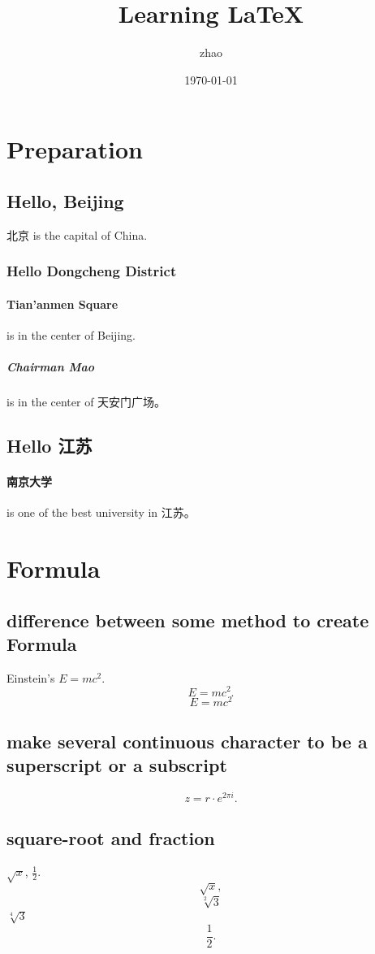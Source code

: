 \documentclass[12pt]{ctexart}
\title{Learning \LaTeX}
\author{zhao}
\date{\today}
\begin{document}
\maketitle
\tableofcontents
\section{Preparation}
\subsection{Hello, Beijing}
北京 is the capital of China.
\subsubsection{Hello Dongcheng District}
\paragraph{Tian'anmen Square}
is in the center of Beijing.
\subparagraph{Chairman Mao}
is in the center of 天安门广场。
\subsection{Hello 江苏}
\paragraph{南京大学} is one of the best university in 江苏。

\section{Formula}
\subsection{difference between some method to create Formula}
Einstein's $E=mc^2$.
\[E=mc^2.\]
\begin{equation}
    E=mc^2
\end{equation}
\subsection{make several continuous character to be a superscript or a subscript}
\[z=r\cdot e^{2\pi i}.\]
\subsection{square-root and fraction}
$\sqrt{x}$, $\frac{1}{2}$.
\[\sqrt{x},\]
\[\sqrt[2]{3}\]
$\sqrt[4]{3}$
\[\frac{1}{2}.\]
\end{document}
